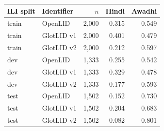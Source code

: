 \begin{tabular}{llrrr}
\toprule
ILI split & Identifier & $n$ & Hindi & Awadhi \\
\midrule
train & OpenLID & 2,000 & 0.315 & 0.549 \\
train & GlotLID v1 & 2,000 & 0.401 & 0.479 \\
train & GlotLID v2 & 2,000 & 0.212 & 0.597 \\
dev & OpenLID & 1,333 & 0.255 & 0.542 \\
dev & GlotLID v1 & 1,333 & 0.329 & 0.478 \\
dev & GlotLID v2 & 1,333 & 0.177 & 0.593 \\
test & OpenLID & 1,502 & 0.152 & 0.730 \\
test & GlotLID v1 & 1,502 & 0.204 & 0.683 \\
test & GlotLID v2 & 1,502 & 0.082 & 0.801 \\
\bottomrule
\end{tabular}
